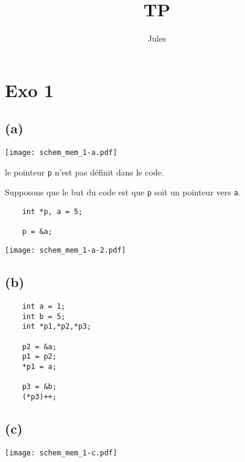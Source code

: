 \documentclass{article}
\title{TP}
\author{Jules}
\begin{document}
\maketitle


\section*{Exo 1}

\subsection*{(a)}

\texttt{[image: schem\_mem\_1-a.pdf]}

le pointeur \texttt{p} n'est pas définit dans le code.

Supposons que le but du code est que \texttt{p} soit un
 pointeur vers \texttt{a}.

\begin{lstlisting}
    int *p, a = 5;

    p = &a;
\end{lstlisting}

\texttt{[image: schem\_mem\_1-a-2.pdf]}

\subsection*{(b)}

\begin{lstlisting}
    int a = 1;
    int b = 5;
    int *p1,*p2,*p3;

    p2 = &a;
    p1 = p2;
    *p1 = a;

    p3 = &b;
    (*p3)++;
\end{lstlisting}

\subsection*{(c)}

\texttt{[image: schem\_mem\_1-c.pdf]}
\end{document}

